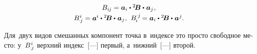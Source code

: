 \begin{otherlanguage}{russian}
\begin{equation}
\begin{array}{c}
B_{i\hspace{-0.1ex}j} = \bm{a}_i \dotp {^2\!\bm{B}} \dotp \hspace{0.1ex} \bm{a}_j \hspace{0.1ex}, \\[0.25em]
%
B_{\hspace{-0.2ex} \cdot j}^{\hspace{0.1ex}i} = \bm{a}^{\hspace{-0.05ex}i} \dotp {^2\!\bm{B}} \dotp \hspace{0.1ex} \bm{a}_j \hspace{0.1ex}, \:\,
B_{\hspace{-0.1ex}i}^{\hspace{-0.05ex} \cdot j} \hspace{-0.2ex} = \bm{a}_i \dotp {^2\!\bm{B}} \dotp \hspace{0.1ex} \bm{a}^{\hspace{0.1ex}j} \hspace{-0.1ex}.
\end{array}\end{equation}

\vspace{-0.1em}\noindent Для~двух видов смешанных компонент точка в~индексе это просто свободное место: у~${B_{\hspace{-0.2ex} \cdot j}^{\hspace{0.1ex}i}}$ верхний индекс~[---] первый, а~ниж\-ний~[---] второй.


\end{otherlanguage}
